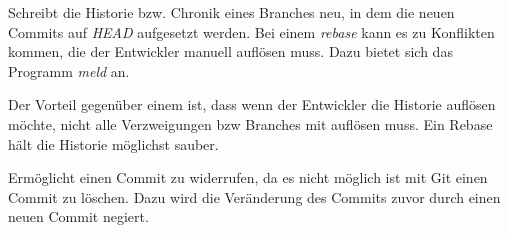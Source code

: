 \label{git-commands.advanced.rebase}
Schreibt die Historie bzw. Chronik eines Branches neu, in dem die neuen Commits auf \textit{HEAD} aufgesetzt werden. Bei einem \textit{rebase} kann es zu Konflikten kommen, die der Entwickler manuell auflösen muss. Dazu bietet sich das Programm \textit{meld} an. 

Der Vorteil gegenüber einem \textit{} ist, dass wenn der Entwickler die Historie auflösen möchte, nicht alle Verzweigungen bzw Branches mit auflösen muss. Ein Rebase hält die Historie möglichst sauber.

\label{git-commands.advanced.reset}
Ermöglicht einen Commit zu widerrufen, da es nicht möglich ist mit Git einen Commit zu löschen. Dazu wird die Veränderung des Commits zuvor durch einen neuen Commit negiert.

\label{git-commands.advanced.revert}

\label{git-commands.advanced.log}

\label{git-commands.advanced.status}

\label{git-commands.advanced.diff}